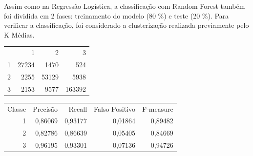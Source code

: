 Assim como na Regressão Logística, a classificação com Random Forest também foi dividida em 2 fases: treinamento do modelo (80 \%) e teste (20 \%). Para verificar a classificação, foi considerado a clusterização realizada previamente pelo K Médias. 

\begin{tabular}{ r r r r }

         & 1 & 2 & 3 \\
    1    & 27234 & 1470   & 524  \\
    2    & 2255   & 53129 & 5938  \\
    3    & 2153  & 9577   & 163392
\end{tabular}


\begin{tabular}{ r r r r r }

  Classe & Precisão & Recall  & Falso Positivo & F-measure  \\
    1    & 0,86069  & 0,93177 & 0,01864        & 0,89482    \\
    2    & 0,82786  & 0,86639 & 0,05405        & 0,84669    \\
    3    & 0,96195  & 0,93301 & 0,07136        & 0,94726
\end{tabular}






